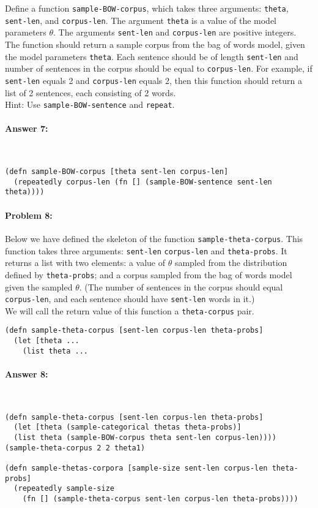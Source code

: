 \documentclass[12pt, letterpaper]{article}
\begin{document}
\noindent Define a function \texttt{sample-BOW-corpus}, which takes
three arguments: \texttt{theta}, \texttt{sent-len}, and
\texttt{corpus-len}. The argument \texttt{theta} is a value of the
model parameters $\theta$. The arguments \texttt{sent-len} and
\texttt{corpus-len} are positive integers. The function should return
a sample corpus from the bag of words model, given the model
parameters \texttt{theta}. Each sentence should be of length
\texttt{sent-len} and number of sentences in the corpus should be
equal to \texttt{corpus-len}. For example, if \texttt{sent-len} equals
2 and \texttt{corpus-len} equals 2, then this function should return a
list of 2 sentences, each consisting of 2 words.
\\

\noindent Hint: Use \texttt{sample-BOW-sentence} and \texttt{repeat}.

\paragraph{Answer 7:}~\begin{lstlisting}
(defn sample-BOW-corpus [theta sent-len corpus-len]
  (repeatedly corpus-len (fn [] (sample-BOW-sentence sent-len theta))))
\end{lstlisting}

\hrulefill
\paragraph{Problem 8:}

Below we have defined the skeleton of the function
\texttt{sample-theta-corpus}. This function takes three arguments:
\texttt{sent-len} \texttt{corpus-len} and \texttt{theta-probs}. It
returns a list with two elements: a value of $\theta$ sampled from the
distribution defined by \texttt{theta-probs}; and a corpus sampled
from the bag of words model given the sampled $\theta$. (The number of
sentences in the corpus should equal \texttt{corpus-len}, and each
sentence should have \texttt{sent-len} words in it.)
\\

\noindent We will call the return value of this function a \texttt{theta-corpus} pair.

\begin{lstlisting}
(defn sample-theta-corpus [sent-len corpus-len theta-probs]
  (let [theta ...
    (list theta ...
\end{lstlisting}

\paragraph{Answer 8:}~\begin{lstlisting}
(defn sample-theta-corpus [sent-len corpus-len theta-probs]
  (let [theta (sample-categorical thetas theta-probs)]
  (list theta (sample-BOW-corpus theta sent-len corpus-len))))
(sample-theta-corpus 2 2 theta1)

(defn sample-thetas-corpora [sample-size sent-len corpus-len theta-probs]
  (repeatedly sample-size 
    (fn [] (sample-theta-corpus sent-len corpus-len theta-probs))))
\end{lstlisting}
\end{document}
